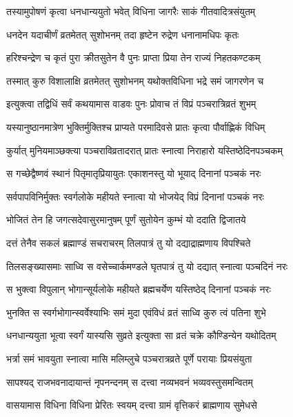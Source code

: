 \twolineshloka
{तस्यामुपोषणं कृत्वा धनधान्ययुतो भवेत्}
{विधिना जागरैः साकं गीतवादित्रसंयुतम्} %

\twolineshloka
{धनदेन यदाचीर्णं व्रतमेतत् सुशोभनम्}
{तदा हृष्टेन रुद्रेण धनानामधिपः कृतः} %

\twolineshloka
{हरिश्चन्द्रेण च कृतं पुरा क्रीतसुतेन वै}
{पुनः प्राप्ता प्रिया तेन राज्यं निहतकण्टकम्} %

\twolineshloka
{तस्मात् कुरु विशालाक्षि व्रतमेतत् सुशोभनम्}
{यथोक्तविधिना भद्रे समं जागरणेन च} %

\twolineshloka
{इत्युक्त्वा तद्विधिं सर्वं कथयामास वाडवः}
{पुनः प्रोवाच तं विप्रं पञ्चरात्रिव्रतं शुभम्} %

\twolineshloka
{यस्यानुष्ठानमात्रेण भुक्तिर्मुक्तिश्च प्राप्यते}
{परमादिवसे प्रातः कृत्वा पौर्वाह्णिकं विधिम्} %

\twolineshloka
{कुर्यात् मुनियमाञ्छक्त्या पञ्चराविव्रतादरात्}
{प्रातः स्नात्वा निराहारो यस्तिष्ठेदिनपञ्चकम्} %

\twolineshloka
{स गच्छेद्वैष्णवं स्थानं पितृमातृप्रियायुतः}
{एकाशनस्तु यो भूयाद् दिनानां पञ्चकं नरः} %

\twolineshloka
{सर्वपापविनिर्मुक्तः स्वर्गलोके महीयते}
{स्नात्वा यो भोजयेद् विप्रं दिनानां पञ्चकं नरः} %

\twolineshloka
{भोजितं तेन हि जगत्सदेवासुरमानुषम्}
{पूर्णं सुतोयेन कुम्भं यो ददाति द्विजातये} %

\twolineshloka
{दत्तं तेनैव सकलं ब्रह्माण्डं सचराचरम्}
{तिलपात्रं तु यो दद्याद्राह्मणाय विपश्चिते} %

\twolineshloka
{तिलसङ्ख्यासमाः साध्वि स वसेच्चार्कमण्डले}
{घृतपात्रं तु यो दद्यात् स्नात्वा पञ्चदिनं नरः} %

\twolineshloka
{स भुक्त्वा विपुलान् भोगान्सूर्यलोके महीयते}
{ब्रह्मचर्येण यस्तिष्ठेद् दिनानां पञ्चकं नरः} %

\twolineshloka
{भुनक्ति स स्वर्गभोगान्स्वर्वेश्याभिः समं मुदा}
{एवंविधं व्रतं साध्वि कुरु त्वं पतिना शुभे} %

\twolineshloka
{धनधान्ययुता भूत्वा स्वर्गं यास्यसि सुव्रते}
{इत्युक्ता सा व्रतं चक्रे कौण्डिन्येन यथोदितम्} %

\twolineshloka
{भर्त्रा समं भावयुता स्नात्वा मासि मलिम्लुचे}
{पञ्चरात्रव्रते पूर्णे परायाः प्रियसंयुता} %

\twolineshloka
{सापश्यद् राजभवनादायान्तं नृपनन्दनम्}
{स दत्त्वा नव्यभवनं भव्यवस्तुसमन्वितम्} %

\twolineshloka
{वासयामास विधिना विधिना प्रेरितः स्वयम्}
{दत्त्वा ग्रामं वृत्तिकरं ब्राह्मणाय सुमेधसे} %

